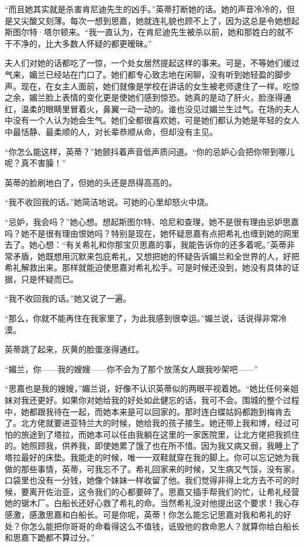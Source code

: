 \par “而且她其实就是杀害肯尼迪先生的凶手。”英蒂打断她的话。她的声音冷冷的，但是又尖酸又刻薄。每次一想到思嘉，她就连礼貌也顾不上了，因为这总是令她想起斯图尔特·塔尔顿来。“我一直认为，在肯尼迪先生被杀以前，她和那姓白的就不干不净的，比大多数人怀疑的都更暧昧。”
\par 夫人们对她的话都吃了一惊，一个处女居然提起这样的事来。可是，不等她们缓过气来，媚兰已经站在门口了。她们都专心致志地在闲聊，没有听到她轻盈的脚步声。现在，在女主人面前，她们就像是学校在讲话的女生被老师逮住了一样。吃惊之余，媚兰脸上表情的变化更是使她们感到惊恐。她真的是动了肝火，脸涨得通红，温柔的眼睛里冒着火，鼻翼一动一动的。谁也没见过媚兰生过气。在场的夫人中没有一个人认为她会生气。她们全都很喜欢她，可是她们都认为她是年轻的女人中最恬静、最柔顺的人，对长辈恭顺从命，但却没有主见。
\par “你怎么能这样，英蒂？”她颤抖着声音低声质问道。“你的忌妒心会把你带到哪儿呢？真不害臊！”
\par 英蒂的脸刷地白了，但她的头还是昂得高高的。
\par “我不收回我的话。”她简洁地说。可她的心里却怒火中烧。
\par “忌妒，我会吗？”她心想。想起斯图尔特、哈尼和查理，她不是很有理由忌妒思嘉吗？她不是很有理由恨她吗？特别是现在，她怀疑思嘉有点把希礼也缠到她的网里去了。她心想：“有关希礼和你那宝贝思嘉的事，我能告诉你的还多着呢。”英蒂非常矛盾，她既想用沉默来包庇希礼，又想把她的怀疑告诉媚兰和全世界的人，好把希礼解救出来。那样就能迫使思嘉对希礼松手。可是时候还没到，她没有具体的证据，只是怀疑而已。
\par “我不收回我的话。”她又说了一遍。
\par “那么，你就不能再住在我家里了，为此我感到很幸运。”媚兰说，话说得非常冷漠。
\par 英蒂跳了起来，灰黄的脸蛋涨得通红。
\par “媚兰，你——我的嫂嫂——你不会为了那个放荡女人跟我吵架吧——”
\par “思嘉也是我的嫂嫂，”媚兰说，好像不认识英蒂似的两眼平视着她。“她比任何亲姐妹对我还更好。如果你对她给我的好处如此健忘的话，我可不会。围城的整个过程中，她都跟我待在一起，而她本来是可以回家的。那时连白蝶姑妈都跑到梅肯去了。北方佬就要进亚特兰大的时候，她给我的孩子接生。她还带上我和博，经过可怕的旅途到了塔拉，而她本可以任由我躺在这里的一家医院里，让北方佬把我抓住的。她照顾我，供养我，即使她累了饿了也在所不惜。因为我又病又弱，我睡上了塔拉最好的床垫。我能走的时候，唯一一双鞋就穿在我的脚上。你可以忘记她为我做的那些事情，英蒂，可我忘不了。希礼回家来的时候，又生病又气馁，没有家，口袋里也没有一分钱，她像个妹妹一样收留了他。我们觉得非得上北方去不可的时候，要离开佐治亚，这令我们的心都要碎了。思嘉又插手帮我们的忙，让希礼经营她的锯木厂。白船长还好心救了希礼的命。当然希礼没对他提出这个要求！我心存感激，感激思嘉和白船长。可是你呢，英蒂！你怎么能忘记思嘉对我和希礼的好处？你怎么能把你哥哥的命看得这么不值钱，诋毁他的救命恩人？就算你给白船长和思嘉下跪都不算过分。”
